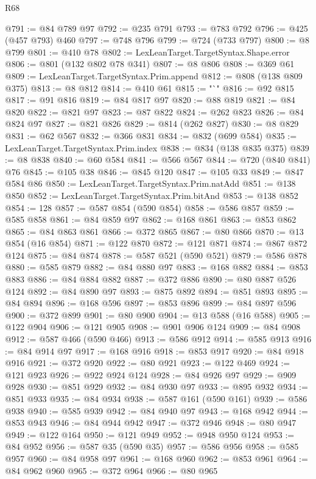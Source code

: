\begin{lexlean}{R68}
\begin{coremodule}
@791 := @84 @789 @97
@792 := @235 @791
@793 := @783 @792
@796 := @425 (@457 @793) @460
@797 := @748 @796
@799 := @724 (@733 @797)
@800 := @8 @799
@801 := @410 @78
@802 := LexLeanTarget.TargetSyntax.Shape.error
@806 := @801 (@132 @802 @78 @341)
@807 := @8 @806
@808 := @369 @61
@809 := LexLeanTarget.TargetSyntax.Prim.append
@812 := @808 (@138 @809 @375)
@813 := @8 @812
@814 := @410 @61
@815 := "`"
@816 := @92 @815
@817 := @91 @816
@819 := @84 @817 @97
@820 := @88 @819
@821 := @84 @820
@822 := @821 @97
@823 := @87 @822
@824 := @262 @823
@826 := @84 @824 @97
@827 := @821 @826
@829 := @814 (@262 @827)
@830 := @8 @829
@831 := @62 @567
@832 := @366 @831
@834 := @832 (@699 @584)
@835 := LexLeanTarget.TargetSyntax.Prim.index
@838 := @834 (@138 @835 @375)
@839 := @8 @838
@840 := @60 @584
@841 := @566 @567
@844 := @720 (@840 @841) @76
@845 := @105 @38
@846 := @845 @120
@847 := @105 @33
@849 := @847 @584 @86
@850 := LexLeanTarget.TargetSyntax.Prim.natAdd
@851 := @138 @850
@852 := LexLeanTarget.TargetSyntax.Prim.bitAnd
@853 := @138 @852
@854 := 128
@857 := @587 @854 (@590 @854)
@858 := @586 @857
@859 := @585 @858
@861 := @84 @859 @97
@862 := @168 @861
@863 := @853 @862
@865 := @84 @863 @861
@866 := @372 @865
@867 := @80 @866
@870 := @13 @854 (@16 @854)
@871 := @122 @870
@872 := @121 @871
@874 := @867 @872 @124
@875 := @84 @874
@878 := @587 @521 (@590 @521)
@879 := @586 @878
@880 := @585 @879
@882 := @84 @880 @97
@883 := @168 @882
@884 := @853 @883
@886 := @84 @884 @882
@887 := @372 @886
@890 := @80 @887 @526 @124
@892 := @84 @890 @97
@893 := @875 @892
@894 := @851 @893
@895 := @84 @894
@896 := @168 @596
@897 := @853 @896
@899 := @84 @897 @596
@900 := @372 @899
@901 := @80 @900
@904 := @13 @588 (@16 @588)
@905 := @122 @904
@906 := @121 @905
@908 := @901 @906 @124
@909 := @84 @908
@912 := @587 @466 (@590 @466)
@913 := @586 @912
@914 := @585 @913
@916 := @84 @914 @97
@917 := @168 @916
@918 := @853 @917
@920 := @84 @918 @916
@921 := @372 @920
@922 := @80 @921
@923 := @122 @469
@924 := @121 @923
@926 := @922 @924 @124
@928 := @84 @926 @97
@929 := @909 @928
@930 := @851 @929
@932 := @84 @930 @97
@933 := @895 @932
@934 := @851 @933
@935 := @84 @934
@938 := @587 @161 (@590 @161)
@939 := @586 @938
@940 := @585 @939
@942 := @84 @940 @97
@943 := @168 @942
@944 := @853 @943
@946 := @84 @944 @942
@947 := @372 @946
@948 := @80 @947
@949 := @122 @164
@950 := @121 @949
@952 := @948 @950 @124
@953 := @84 @952
@956 := @587 @35 (@590 @35)
@957 := @586 @956
@958 := @585 @957
@960 := @84 @958 @97
@961 := @168 @960
@962 := @853 @961
@964 := @84 @962 @960
@965 := @372 @964
@966 := @80 @965

\end{coremodule}
\end{lexlean}
